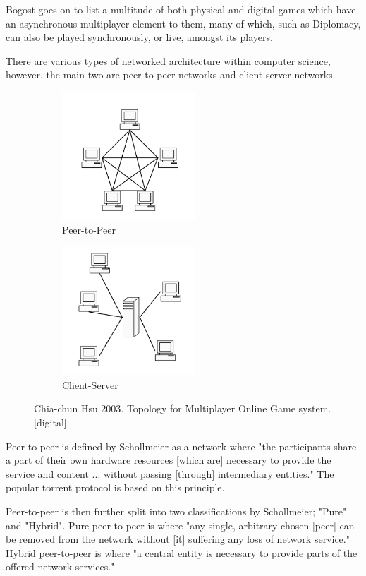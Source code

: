 \documentclass{article}
\begin{document}
Bogost goes on to list a multitude of both physical and digital games which have an asynchronous multiplayer element to them, many of which, such as Diplomacy\cite{diplomacy1959}, can also be played synchronously, or live, amongst its players.

There are various types of networked architecture within computer science, however, the main two are peer-to-peer networks and client-server networks.
\begin{figure}[!h]
    \centering
    \begin{subfigure}[b]{5cm}
        \centering
        \includegraphics[width=5cm]{peer-to-peer.png}
        \caption{Peer-to-Peer}
    \end{subfigure}
    \begin{subfigure}[b]{5cm}
        \centering
        \includegraphics[width=5cm]{client-server.png}
        \caption{Client-Server}
    \end{subfigure}
    \caption{Chia-chun Hsu 2003. Topology for Multiplayer Online Game system. [digital]}
\end{figure}

Peer-to-peer is defined by Schollmeier\cite{schollmeier2001} as a network where "the participants share a part of their own hardware resources [which are] necessary to provide the service and content ... without passing [through] intermediary entities." The popular torrent protocol is based on this principle.

Peer-to-peer is then further split into two classifications by Schollmeier; "Pure" and "Hybrid". Pure peer-to-peer is where "any single, arbitrary chosen [peer] can be removed from the network without [it] suffering any loss of network service." Hybrid peer-to-peer is where "a central entity is necessary to provide parts of the offered network services."
\end{document}
